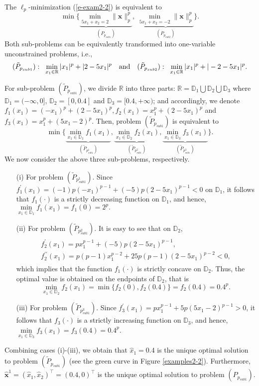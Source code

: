 \documentclass[12pt]{article}
\begin{document}
The $\ell_p$-minimization (\ref{e-exam2-2}) is equivalent to
$$
\min\{\underbrace{\min\limits_{5x_1+x_2=2}\| \mathbf{x} \|_p^p}\limits_{(P_{p_{sub1}})},\;\underbrace{\min\limits_{5x_1+x_2=-2}\| \mathbf{x } \|_p^p}\limits_{(P_{p_{sub2}})}\}.
$$
Both sub-problems can be equivalently transformed into one-variable unconstrained problems, i.e.,
\begin{eqnarray}\label{exam2-subp}
(\tilde{P}_{p_{sub1}}):\;\; \min\limits_{x_1\in\mathbb{R}}|x_1|^p+|2-5x_1|^p\quad
\mbox{\rm and}\quad
(\tilde{P}_{p_{sub2}}):\;\; \min\limits_{x_1\in\mathbb{R}}|x_1|^p+|-2-5x_1|^p.
\end{eqnarray}

For sub-problem $(\tilde{P}_{p_{sub1}})$, we divide $\mathbb{R}$ into three parts: $\mathbb{R}=\mathbb{D}_1\bigcup\mathbb{D}_2\bigcup\mathbb{D}_3$
where $\mathbb{D}_1=(-\infty,0]$, $\mathbb{D}_2=[0,0.4]$ and $\mathbb{D}_3=[0.4,+\infty)$; and accordingly, we denote $f_1(x_1)=(-x_1)^p+(2-5x_1)^p,f_2(x_1)=x_1^p+(2-5x_1)^p$ and $f_3(x_1)=x_1^p+(5x_1-2)^p$. Then, problem $(\tilde{P}_{p_{sub1}})$ is equivalent to
$$
\min\{\underbrace{\min\limits_{x_1\in\mathbb{D}_1}f_1(x_1)}\limits_{(\tilde{P}_{p^1_{sub1}})},
\underbrace{\min\limits_{x_1\in\mathbb{D}_2}f_2(x_1)}\limits_{(\tilde{P}_{p^2_{sub1}})},
\underbrace{\min\limits_{x_1\in\mathbb{D}_3}f_3(x_1)}\limits_{(\tilde{P}_{p^3_{sub1}})}\}.
$$
We now consider the above three sub-problems, respectively.
\begin{itemize}
  \item [(i)] For problem $(\tilde{P}_{p^1_{sub1}})$. Since $f^\prime_1(x_1)=(-1)p(-x_1)^{p-1}+(-5)p(2-5x_1)^{p-1}<0$
      on $\mathbb{D}_1$, it follows that $f_1(\cdot)$ is a strictly decreasing function on $\mathbb{D}_1$, and hence,
      $\min\limits_{x_1\in\mathbb{D}_1}f_1(x_1)=f_1(0)=2^p.$
 \item [(ii)] For problem $(\tilde{P}_{p^2_{sub1}})$. It is easy to see that on $\mathbb{D}_2$,
     \begin{eqnarray*}
     \begin{array}{l}
     f^\prime_2(x_1)=px_1^{p-1}+(-5)p(2-5x_1)^{p-1}, \\ f^{\prime\prime}_2(x_1)=p(p-1)x_1^{p-2}+25p(p-1)(2-5x_1)^{p-2}<0,
     \end{array}
     \end{eqnarray*}
     which implies that the function $f_1(\cdot)$ is strictly concave on $\mathbb{D}_2$. Thus, the optimal value is obtained on the endpoints of $\mathbb{D}_2$, that is
     $$
     \min\limits_{x_1\in\mathbb{D}_2}f_2(x_1)=\min\{f_2(0),f_2(0.4)\}=f_2(0.4)=0.4^p.
     $$
\item [(iii)] For problem $(\tilde{P}_{p^3_{sub1}})$. Since
    $f^\prime_3(x_1)=px_1^{p-1}+5p(5x_1-2)^{p-1}>0$,
    it follows that $f_3(\cdot)$ is a strictly increasing function on $\mathbb{D}_3$, and hence,       $\min\limits_{x_1\in\mathbb{D}_3}f_3(x_1)=f_3(0.4)=0.4^p$.
\end{itemize}
Combining cases (i)-(iii), we obtain that $\hat{x}_1=0.4$ is the unique optimal solution to problem $(\tilde{P}_{p_{sub1}})$ (see the green curve in Figure \ref{examples2-2}). Furthermore,  $\hat{\mathbf{x}}^1=(\hat{x}_1,\hat{x}_2)^\top=(0.4,0)^\top$ is the unique optimal solution to problem $(P_{p_{sub1}})$.
\end{document}
